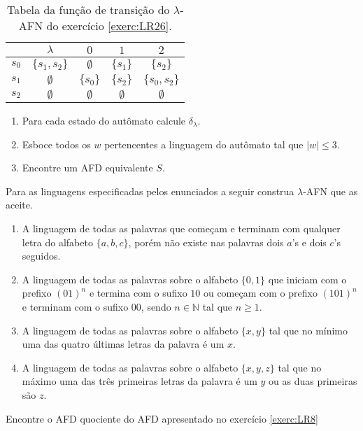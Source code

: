 \begin{table}[h]
	\centering
	\begin{tabular}{c|cccc}
		\backslashbox{$Q'$}{$\Sigma$}	& $\lambda$ & $0$ & $1$ & $2$\\\hline
		$s_0$ & $\{s_1, s_2\}$ & $\emptyset$  & $\{s_1\}$ & $\{s_2\}$\\
		$s_1$ & $\emptyset$ & $\{s_0\}$ & $\{s_2\}$ & $\{s_0, s_2\}$ \\
		$s_2$ & $\emptyset$ & $\emptyset$ & $\emptyset$ & $\emptyset$ 		
	\end{tabular}
	\caption{Tabela da função de transição do $\lambda$-AFN do exercício \ref{exerc:LR26}.}
	\label{tab:DeltaLAFN-Exe26}
\end{table}

\begin{enumerate}
	\item Para cada estado do autômato calcule $\delta_\lambda$.
	\item Esboce todos os $w$ pertencentes a linguagem do autômato tal que $|w| \leq 3$.
	\item Encontre um AFD equivalente $S$. 
\end{enumerate}

\begin{exercise}\label{exerc:LR27}
	Para as linguagens especificadas pelos enunciados a seguir construa $\lambda$-AFN que as aceite.
\end{exercise}

\begin{enumerate}
	\item A linguagem de todas as palavras que começam e terminam com qualquer letra do alfabeto $\{a,b,c\}$, porém não existe nas palavras dois $a$'s e dois $c$'s seguidos.
	\item A linguagem de todas as palavras sobre o alfabeto $\{0,1\}$ que iniciam com o prefixo $(01)^n$ e termina com o sufixo $10$ ou começam com o prefixo $(101)^n$ e terminam com o sufixo $00$, sendo $n \in \mathbb{N}$ tal que $n \geq 1$.
	\item A linguagem de todas as palavras sobre o alfabeto $\{x, y\}$ tal que no mínimo uma das quatro últimas letras da palavra é um $x$.
	\item A linguagem de todas as palavras sobre o alfabeto $\{x, y, z\}$ tal que no máximo uma das três primeiras letras da palavra é um $y$ ou as duas primeiras são $z$.
\end{enumerate}

\begin{exercise}\label{exerc:LR28}
	Encontre o AFD quociente do AFD apresentado no exercício \ref{exerc:LR8}
\end{exercise}

